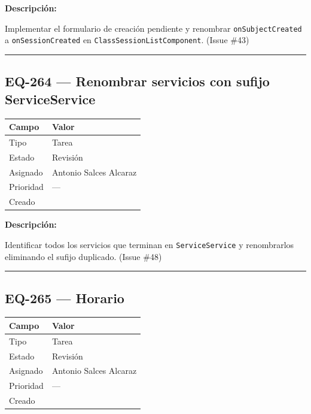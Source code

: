 \documentclass[
  spanish,
  11pt,
]{report}
\newcounter{none} %
\begin{document}
\textbf{Descripción:}

Implementar el formulario de creación pendiente y renombrar
\texttt{onSubjectCreated} a \texttt{onSessionCreated} en
\texttt{ClassSessionListComponent}. (Issue \#43)

\begin{center}\rule{0.5\linewidth}{0.5pt}\end{center}

\subsection{EQ-264 --- Renombrar servicios con sufijo
ServiceService}\label{eq-264-renombrar-servicios-con-sufijo-serviceservice}

{\def\LTcaptype{none} %
\begin{longtable}[]{@{}ll@{}}
\toprule\noalign{}
Campo & Valor \\
\midrule\noalign{}
\endhead
\bottomrule\noalign{}
\endlastfoot
Tipo & Tarea \\
Estado & Revisión \\
Asignado & Antonio Salces Alcaraz \\
Prioridad & --- \\
Creado & \\
\end{longtable}
}

\textbf{Descripción:}

Identificar todos los servicios que terminan en \texttt{ServiceService}
y renombrarlos eliminando el sufijo duplicado. (Issue \#48)

\begin{center}\rule{0.5\linewidth}{0.5pt}\end{center}

\subsection{EQ-265 --- Horario}\label{eq-265-horario}

{\def\LTcaptype{none} %
\begin{longtable}[]{@{}ll@{}}
\toprule\noalign{}
Campo & Valor \\
\midrule\noalign{}
\endhead
\bottomrule\noalign{}
\endlastfoot
Tipo & Tarea \\
Estado & Revisión \\
Asignado & Antonio Salces Alcaraz \\
Prioridad & --- \\
Creado & \\
\end{longtable}
}
\end{document}
